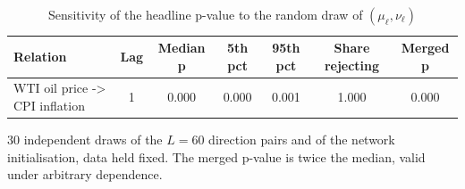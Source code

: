 \begin{table}[htbp]
\centering
\caption{Sensitivity of the headline p-value to the random draw of $(\mu_\ell,\nu_\ell)$}
\label{tab:macrostab}
\small
\begin{tabular}{lcccccc}
\toprule
Relation & Lag & Median p & 5th pct & 95th pct & Share rejecting & Merged p \\
\midrule
WTI oil price -> CPI inflation & 1 & 0.000 & 0.000 & 0.001 & 1.000 & 0.000 \\
\bottomrule
\end{tabular}

\begin{minipage}{\linewidth}\footnotesize
30 independent draws of the $L=60$ direction pairs and of the network initialisation, data held fixed.  The merged p-value is twice the median, valid under arbitrary dependence.
\end{minipage}
\end{table}
